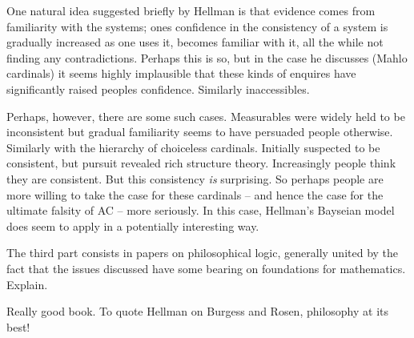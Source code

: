 \documentclass{asl}
\theoremstyle{definition}
\begin{document}
One natural idea suggested briefly by Hellman is that evidence comes from familiarity with the systems; ones confidence in the consistency of a system is gradually increased as one uses it, becomes familiar with it, all the while not finding any contradictions. Perhaps this is so, but in the case he discusses (Mahlo cardinals) it seems highly implausible that these kinds of enquires have significantly raised peoples confidence. Similarly inaccessibles.

Perhaps, however, there are some such cases. Measurables were widely held to be inconsistent but gradual familiarity seems to have persuaded people otherwise. Similarly with the hierarchy of choiceless cardinals. Initially suspected to be consistent, but pursuit revealed rich structure theory. Increasingly people think they are consistent. But this consistency \emph{is} surprising. So perhaps people are more willing to take the case for these cardinals -- and hence the case for the ultimate falsity of AC -- more seriously. In this case, Hellman's Bayseian model does seem to apply in a potentially interesting way.



The third part consists in papers on philosophical logic, generally united by the fact that the issues discussed have some bearing on foundations for mathematics. Explain.

Really good book. To quote Hellman on Burgess and Rosen, philosophy at its best!



%
\end{document}
